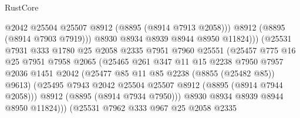 \begin{lexlean}{RustCore}
\begin{coremodule}
                                      @2042
                                      @25504
                                      @25507
                                      @8912
                                      (@8895 (@8914 @7913 @2058)))
                                    @8912
                                    (@8895 (@8914 @7903 @7919)))
                                  @8930
                                  @8934
                                  @8939
                                  @8944
                                  @8950
                                  @11824)))
                            (@25531
                              @7931
                              @333
                              @1780
                              @25
                              @2058
                              @2335
                              @7951
                              @7960
                              @25551
                              (@25457
                                @775
                                @16
                                @25
                                @7951
                                @7958
                                @2065
                                (@25465
                                  @261
                                  @347
                                  @11
                                  @15
                                  @2238
                                  @7950
                                  @7957
                                  @2036
                                  @1451
                                  @2042
                                  (@25477 @85 @11 @85 @2238 (@8855 (@25482 @85)) @9613)
                                  (@25495
                                    @7943
                                    @2042
                                    @25504
                                    @25507
                                    @8912
                                    (@8895 (@8914 @7944 @2058)))
                                  @8912
                                  (@8895 (@8914 @7934 @7950)))
                                @8930
                                @8934
                                @8939
                                @8944
                                @8950
                                @11824)))
                          (@25531
                            @7962
                            @333
                            @967
                            @25
                            @2058
                            @2335

\end{coremodule}
\end{lexlean}
